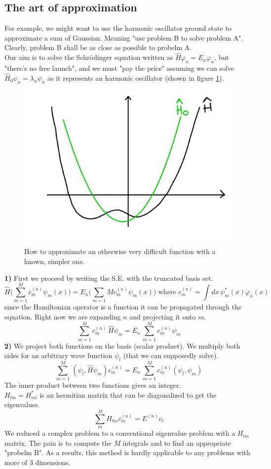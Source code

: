 \subsection{The art of approximation}
For example, we might want to use the harmonic oscillator ground state to approximate a sum of Gaussian. Meaning "use problem B to solve problem A". Clearly, problem B shall be as close as possible to probelm A.\\
Our aim is to solve the Schr{\"o}dinger equation written as $\hat{H}\varphi_n=E_n\varphi_n$, but "there's no free launch", and we must "pay the price" assuming we can solve $\hat{H}_0\psi_n=\lambda_n\psi_n$ as it represents an harmonic oscillator (shown in figure \ref{fig:approximation}).\\
\begin{figure}[htbp!]
\includegraphics[scale=0.20]{img_1.jpg}
\label{fig:approximation}
\caption{How to approximate an otherwise very difficult function with a known, simpler one.}
\end{figure}
\textbf{1)} First we proceed by writing the S.E. with the truncated basis set.
\[
\hat{H}\bigg(\sum_{m=1}^{M}c_m^{(n)}\psi_m(x)\bigg)=E_n\bigg(\sum_{m=1}{M}c_m^{(n)}\psi_m(x)\bigg)
\text{ where $c_m^{(n)}=\int dx\,\psi_m^*(x)\varphi_n(x)$}
\]
since the Hamiltonian operator is a function it can be propagated through the equation. Right now we are expanding $n$ and projecting it onto $m$.\\
\[
\sum_{m=1}^{M}c_m^{(n)}\,\hat{H}\psi_m=E_n\,\sum_{m=1}^{M}c_m^{(n)}\psi_m\]
\textbf{2)} We project both functions on the basis (scalar product). We multiply both sides for an arbitrary wave function $\psi_l$ (that we can supposedly solve).
\[\sum_{m=1}^{M}\,(\psi_l,\hat{H}\psi_m)c_m^{(n)}=E_n\,\sum_{m=1}^{M}c_m^{(n)}(\psi_l,\psi_m)
\]
The inner product between two functions gives an integer. \\
$H_{lm}=H_{ml}^*$ is an hermitian matrix that can be diagonalized to get the eigenvalues.\\
\[
\sum_{m}^{M}H_{lm}c_m^{(n)}=E^{(n)}c_l
\]
We reduced a complex problem to a conventional eigenvalue problem with a $H_{lm}$ matrix. The pain is to compute the $M$ integrals and to find an appropriate "probelm B". As a results, this method is hardly applicable to any problems with more of 3 dimensions. \\

